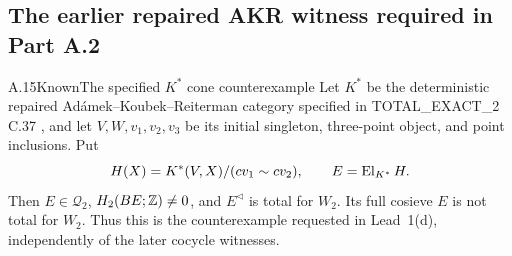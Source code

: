\subsection{The earlier repaired AKR witness required in Part A.2}

\begin{claim}{A.15}{Known}{The specified $K^*$ cone counterexample}\label{A:Kstar-cone}
Let $K^*$ be the deterministic repaired Ad\'amek--Koubek--Reiterman category specified in TOTAL\_EXACT\_2 C.37 \cite{FTOTEX2}, and let $V,W,v_1,v_2,v_3$ be its initial singleton, three-point object, and point inclusions. Put
\[
 H(X)=K^*(V,X)/(cv_1\sim cv_2),\qquad
 E=\operatorname{El}_{K^*}H.
\]
Then $E\in\mathcal Q_2$, $H_2(BE;\mathbb Z)\ne0$, and $E^{\triangleleft}$ is total for $W_2$. Its full cosieve $E$ is not total for $W_2$. Thus this is the counterexample requested in Lead~1(d), independently of the later cocycle witnesses.
\end{claim}

